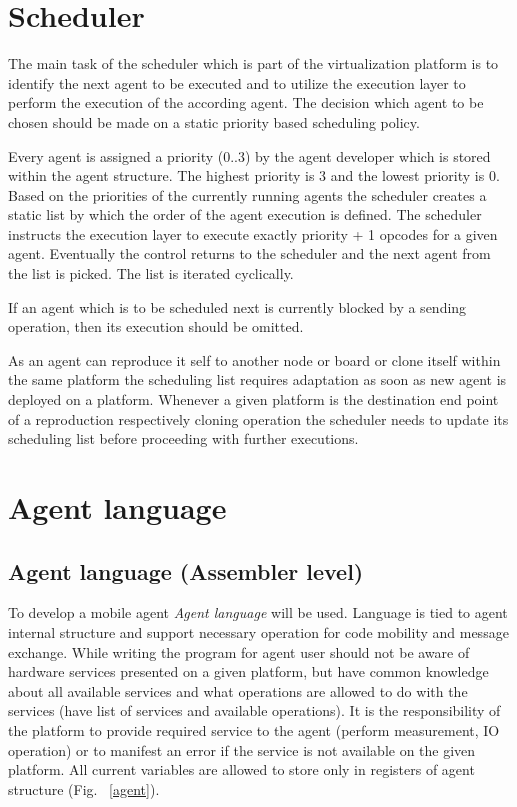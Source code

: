 \documentclass{scrreprt}
\begin{document}
\section{Scheduler}
The main task of the scheduler which is part of the virtualization platform is to identify the next agent to be executed 
and to utilize the execution layer to perform the execution of the according agent. The decision which agent to be chosen 
should be made on a static priority based scheduling policy.


\noindent
Every agent is assigned a priority (0..3) by the agent developer which is stored within the agent structure. 
The highest priority is 3 and the lowest priority is 0. Based on the priorities of the currently running agents 
the scheduler creates a static list by which the order of the agent execution is defined. The scheduler instructs 
the execution layer to execute exactly priority + 1 opcodes for a given agent. Eventually the control returns to 
the scheduler and the next agent from the list is picked. The list is iterated cyclically.


\noindent
If an agent which is to be scheduled next is currently blocked by a sending operation, then its execution should be omitted. 


\noindent
As an agent can reproduce it self to another node or board or clone itself within the same platform the scheduling 
list requires adaptation as soon as new agent is deployed on a platform. Whenever a given platform is the destination 
end point of a reproduction respectively cloning operation the scheduler needs to update its scheduling list before proceeding with further executions.

\section{Agent language}

\subsection{Agent language (Assembler level)}
\noindent
To develop a mobile agent \textit{Agent language} will be used. Language is tied to agent internal structure and support necessary operation for code mobility and message exchange. While writing the program for agent user should not be aware of hardware services presented on a given platform, but have common knowledge about all available services and what operations are allowed to do with the services (have list of services and available operations). It is the responsibility of the platform to provide required service to the agent (perform measurement, IO operation) or to manifest an error if the service is not available on the given platform. All current variables are allowed to store only in registers of agent structure (Fig. ~\ref{agent}).
\end{document}
